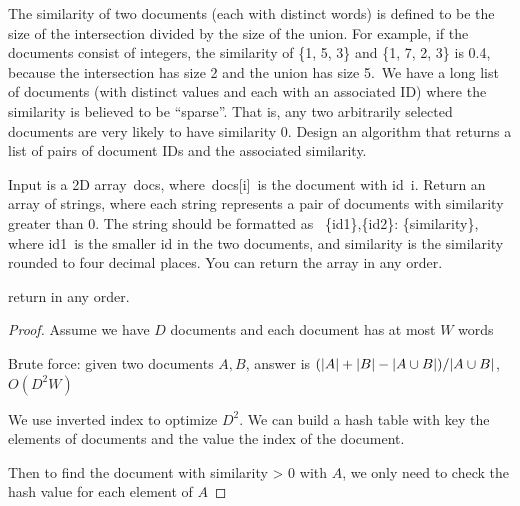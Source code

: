 \documentclass[11pt]{article}
\begin{document}
\begin{problem}
The similarity of two documents (each with distinct words) is defined to be the size of the
intersection divided by the size of the union. For example, if the documents consist of
integers, the similarity of \{1, 5, 3\} and \{1, 7, 2, 3\} is 0.4, because the intersection has size
2 and the union has size 5. We have a long list of documents (with distinct values and each with
an associated ID) where the similarity is believed to be ``sparse''. That is, any two arbitrarily
selected documents are very likely to have similarity 0. Design an algorithm that returns a list
of pairs of document IDs and the associated similarity.

Input is a 2D array docs, where docs[i] is the document with id i. Return an array of strings,
where each string represents a pair of documents with similarity greater than 0. The string
should be formatted as  \{id1\},\{id2\}: \{similarity\}, where id1 is the smaller id in the two
documents, and similarity is the similarity rounded to four decimal places. You can return the
array in any order.

return in any order.
\end{problem}

\begin{proof}
Assume we have \(D\) documents and each document has at most \(W\) words

Brute force: given two documents \(A, B\), answer
is \((\abs{A}+\abs{B}-\abs{A\cup B})/\abs{A\cup B}\), \(O(D^2W)\)

We use inverted index to optimize \(D^2\). We can build a hash table with key the elements of
documents and the value the index of the document.

Then to find the document with similarity > 0 with \(A\), we only need to check the hash value
for each element of \(A\)
\end{proof}
\end{document}
